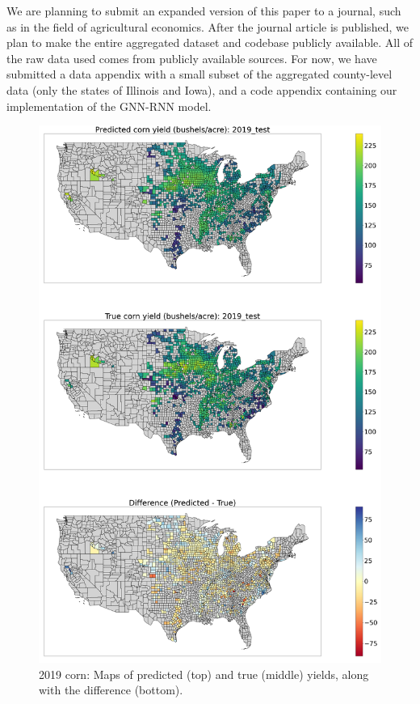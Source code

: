 We are planning to submit an expanded version of this paper to a journal, such as in the field of agricultural economics. After the journal article is published, we plan to make the entire aggregated dataset and codebase publicly available. All of the raw data used comes from publicly available sources. For now, we have submitted a data appendix with a small subset of the aggregated county-level data (only the states of Illinois and Iowa), and a code appendix containing our implementation of the GNN-RNN model. 

\begin{figure}[t]
\centering
\includegraphics[width=0.95\columnwidth]{figs/true_vs_predicted_map_corn_2019_test.png}
\caption{2019 corn: Maps of predicted (top) and true (middle) yields, along with the difference (bottom).}
\label{fig:map_2019corn}
\vspace{-1em}
\end{figure}
